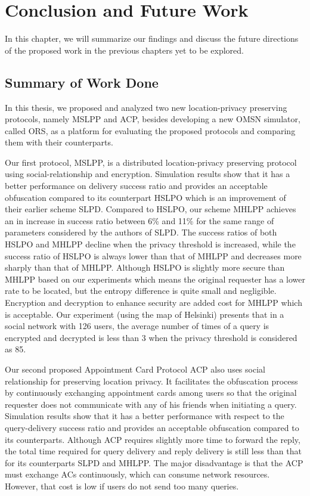 


\chapter{ Conclusion and Future Work}
\label{CFW}
 

\noindent In this chapter, we will summarize our findings and discuss the future directions of the proposed work in the previous chapters yet to be explored. 


\section{ Summary of Work Done}

\noindent In this thesis, we proposed and analyzed two new location-privacy preserving protocols, namely MSLPP and ACP, besides developing a new OMSN simulator, called ORS, as a platform for evaluating the proposed protocols and comparing them with their counterparts.

Our first protocol, MSLPP, is a distributed location-privacy preserving protocol using social-relationship and encryption. Simulation results show that it has a better performance on delivery success ratio and provides an acceptable obfuscation compared to its counterpart HSLPO which is an improvement of their earlier scheme SLPD. Compared to HSLPO, our scheme MHLPP achieves an in increase in success ratio between 6\% and 11\% for the same range of parameters considered by the authors of SLPD. The success ratios of both HSLPO and MHLPP decline when the privacy threshold is increased, while the success ratio of HSLPO is always lower than that of MHLPP and decreases more sharply than that of MHLPP. Although HSLPO is slightly more secure than MHLPP based on our experiments which means the original requester has a lower rate to be located, but the entropy difference is quite small and negligible. Encryption and decryption to enhance security are added cost for MHLPP which is acceptable. Our experiment (using the map of Helsinki) presents that in a social network with 126 users, the average number of times of a query is encrypted and decrypted is less than 3 when the privacy threshold is considered as 85.

Our second proposed Appointment Card Protocol ACP also uses social relationship for preserving location privacy. It facilitates the obfuscation process by continuously exchanging appointment cards among users so that the original requester does not communicate with any of his friends when initiating a query. Simulation results show that it has a better performance with respect to the query-delivery success ratio and provides an acceptable obfuscation compared to its counterparts. Although ACP requires slightly more time to forward the reply, the total time required for query delivery and reply delivery is still less than that for its counterparts SLPD and MHLPP. The major disadvantage is that the ACP must exchange ACs continuously, which can consume network resources. However, that cost is low if users do not send too many queries.

